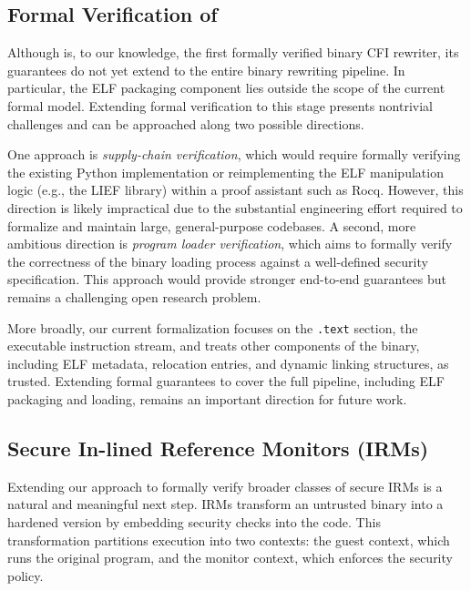{    %


    \subsection{Formal Verification of \ELFPackager}\label{sec:elf_packager_fm}
    Although \pname{} is, to our knowledge, the first formally verified binary CFI rewriter, its guarantees do not yet extend to the entire binary rewriting pipeline. In particular, the ELF packaging component lies outside the scope of the current formal model. Extending formal verification to this stage presents nontrivial challenges and can be approached along two possible directions.

    One approach is \emph{supply-chain verification}, which would require formally verifying the existing Python implementation or reimplementing the ELF manipulation logic (e.g., the LIEF library) within a proof assistant such as Rocq. However, this direction is likely impractical due to the substantial engineering effort required to formalize and maintain large, general-purpose codebases. A second, more ambitious direction is \emph{program loader verification}, which aims to formally verify the correctness of the binary loading process against a well-defined security specification. This approach would provide stronger end-to-end guarantees but remains a challenging open research problem.

    More broadly, our current formalization focuses on the \texttt{.text} section, the executable instruction stream, and treats other components of the binary, including ELF metadata, relocation entries, and dynamic linking structures, as trusted. Extending formal guarantees to cover the full pipeline, including ELF packaging and loading, remains an important direction for future work.
}

\subsection{Secure In-lined Reference Monitors (IRMs)}
Extending our approach to formally verify broader classes of secure IRMs is a natural and meaningful next step. IRMs transform an untrusted binary into a hardened version by embedding security checks into the code. This transformation partitions execution into two contexts: the guest context, which runs the original program, and the monitor context, which enforces the security policy.

